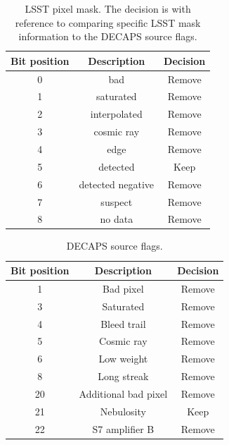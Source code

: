 \documentclass[DM,lsstdraft,toc,usenatbib,authoryear]{lsstdoc}
\begin{document}
\begin{table}
\centering
\caption{LSST pixel mask. The decision is with reference to comparing specific LSST mask information to the DECAPS source flags.}
\label{tab:lsst_mask}
\begin{tabular}{ ccc}
\hline
Bit position & Description & Decision  \\
\hline
0  & bad    & Remove               \\
1  & saturated   & Remove       \\
2  & interpolated  & Remove      \\
3  & cosmic ray   & Remove     \\
4  & edge          & Remove      \\
5  & detected   & Keep         \\
6  & detected negative  & Remove  \\
7  & suspect     & Remove         \\
8  & no data     & Remove         \\
\hline
\end{tabular}
\end{table}

\begin{table}
\centering
\caption{DECAPS source flags.}
\label{tab:decaps_flags}
\begin{tabular}{ ccc}
\hline
Bit position & Description & Decision \\
\hline
1  &     Bad pixel   & Remove         \\
3  &    Saturated    & Remove     \\
4  &    Bleed trail   & Remove      \\
5  &    Cosmic ray    & Remove      \\
6  &    Low weight     & Remove    \\
8  &    Long streak   & Remove      \\
20  &   Additional bad pixel  & Remove     \\
21 &    Nebulosity    & Keep    \\
22  &   S7 amplifier B    & Remove       \\
\hline
\end{tabular}
\end{table}
\end{document}
